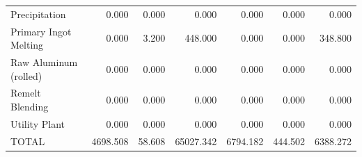 {\begin{tabular}{lrrrrrr}
Precipitation & 0.000 & 0.000 & 0.000 & 0.000 & 0.000 & 0.000 \\
Primary Ingot Melting & 0.000 & 3.200 & 448.000 & 0.000 & 0.000 & 348.800 \\
Raw Aluminum (rolled) & 0.000 & 0.000 & 0.000 & 0.000 & 0.000 & 0.000 \\
Remelt Blending & 0.000 & 0.000 & 0.000 & 0.000 & 0.000 & 0.000 \\
Utility Plant & 0.000 & 0.000 & 0.000 & 0.000 & 0.000 & 0.000 \\
TOTAL & 4698.508 & 58.608 & 65027.342 & 6794.182 & 444.502 & 6388.272 \\
\bottomrule
\end{tabular}
}
